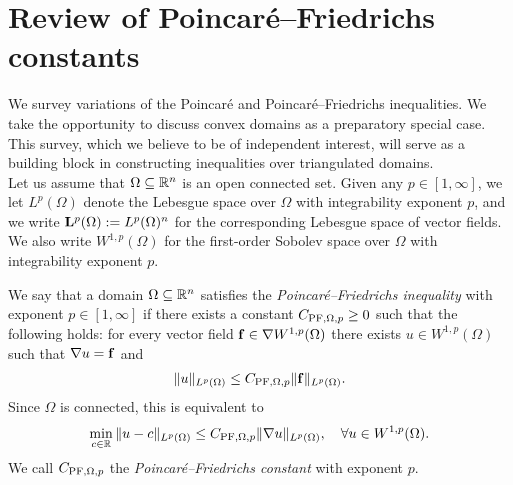 \documentclass[12pt,a4paper]{article}
\begin{document}
\section{Review of Poincar\'e--Friedrichs constants}\label{section:poincare}

We survey variations of the Poincar\'e and Poincar\'e--Friedrichs inequalities. 
We take the opportunity to discuss convex domains as a preparatory special case.
This survey, which we believe to be of independent interest, will serve as a building block in constructing inequalities over triangulated domains.
\\

Let us assume that $\Omega \subseteq {\mathbb R}^{n}$ is an open connected set. 
Given any $p \in [1,\infty]$, we let $L^p(\Omega)$ denote the Lebesgue space over $\Omega$ with integrability exponent $p$, and we write ${\mathbf L}^p(\Omega) := L^p(\Omega)^{n}$ for the corresponding Lebesgue space of vector fields. 
We also write $W^{1,p}(\Omega)$ for the first-order Sobolev space over $\Omega$ with integrability exponent $p$. 


We say that a domain $\Omega \subseteq {\mathbb R}^{n}$ satisfies the \emph{Poincar\'e--Friedrichs inequality} with exponent $p \in [1,\infty]$
if there exists a constant $C_{{\rm PF},\Omega,p} \geq 0$ such that the following holds:
for every vector field ${\mathbf f} \in \nabla W^{1,p}(\Omega)$ there exists $u \in W^{1,p}(\Omega)$
such that $\nabla u = {\mathbf f}$ and 
\begin{align}\label{math:inequalitypf:gradient}
    \| u \|_{L^{p}(\Omega)}
    \leq 
    C_{{\rm PF},\Omega,p} 
    \| {\mathbf f} \|_{L^{p}(\Omega)}
    .
\end{align}
Since $\Omega$ is connected, this is equivalent to  
\begin{align}
    \min_{ c \in {\mathbb R} } \| u - c \|_{L^{p}(\Omega)}
    \leq 
    C_{{\rm PF},\Omega,p} 
    \| \nabla u \|_{L^{p}(\Omega)},
    \quad 
    \forall 
    u \in W^{1,p}(\Omega)
    .
\end{align}
We call $C_{{\rm PF},\Omega,p}$ the \emph{Poincar\'e--Friedrichs constant} with exponent $p$. 
\\
\end{document}
